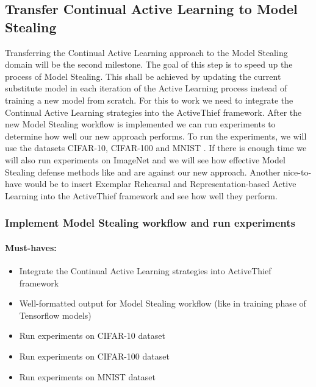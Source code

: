 \documentclass[expose, en]{thesis}
\begin{document}
\subsection{Transfer Continual Active Learning to Model Stealing}
Transferring the Continual Active Learning approach to the Model Stealing domain will be the
second milestone. The goal of this step is to speed up the process of Model Stealing. This shall be achieved by updating
the current substitute model in each iteration of the Active Learning process instead of training a new model from scratch.
For this to work we need to integrate the Continual Active Learning strategies into the ActiveThief \cite{pal2020activethief} framework.
After the new Model Stealing workflow is implemented we can run experiments to determine how well our new approach
performs. To run the experiments, we will use the datasets CIFAR-10, CIFAR-100 and MNIST . If there is enough 
time we will also run experiments on ImageNet and we will see how effective Model Stealing defense methods like
 \cite{orekondy2019prediction} and \cite{juuti2019prada} are against our new approach. Another nice-to-have would be to
insert Exemplar Rehearsal \cite{gepperth2016bio} and Representation-based Active Learning \cite{ren2021survey} into the ActiveThief framework
and see how well they perform.

\subsubsection{Implement Model Stealing workflow and run experiments}
\label{sec:task2}

\paragraph{Must-haves:}
\begin{itemize}
    \item Integrate the Continual Active Learning strategies into ActiveThief framework
    \item Well-formatted output for Model Stealing workflow (like in training phase of Tensorflow models)
    \item Run experiments on CIFAR-10 dataset
    \item Run experiments on CIFAR-100 dataset
    \item Run experiments on MNIST dataset
\end{itemize}
\end{document}
